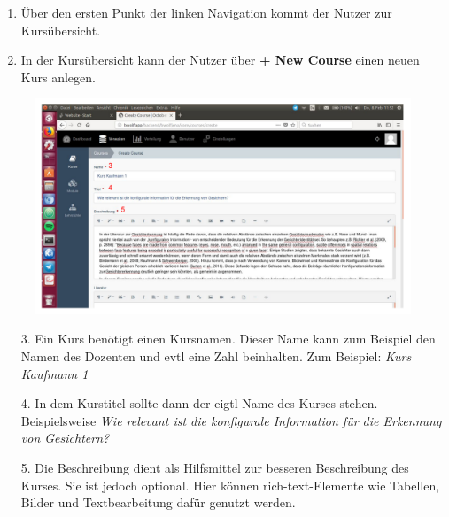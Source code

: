     \begin{enumerate}
     \item Über den ersten Punkt der linken Navigation kommt der Nutzer zur Kursübersicht.
     \item In der Kursübersicht kann der Nutzer über \textbf{+ New Course} einen neuen Kurs anlegen. 
    \end{enumerate}
	\begin{figure}
		\centering
		\includegraphics[scale=0.5]{backend/img/create_course_1.pdf}
	\end{figure}
    \begin{enumerate}
     \item[3.] Ein Kurs benötigt einen Kursnamen. Dieser Name kann zum Beispiel den Namen des Dozenten und evtl eine Zahl beinhalten. Zum Beispiel: \textit{Kurs Kaufmann 1}
     \item[4.] In dem Kurstitel sollte dann der eigtl Name des Kurses stehen. Beispielsweise \textit{Wie relevant ist die konfigurale Information für die Erkennung von Gesichtern?}
     \item[5.] Die Beschreibung dient als Hilfsmittel zur besseren Beschreibung des Kurses. Sie ist jedoch optional.
	       Hier können rich-text-Elemente wie Tabellen, Bilder und Textbearbeitung dafür genutzt werden.
    \end{enumerate}

